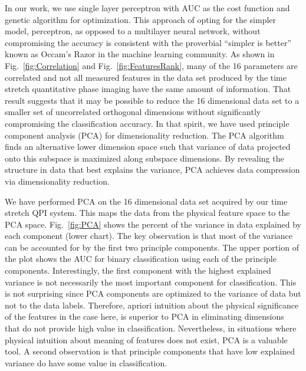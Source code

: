 \documentclass[aps,pra,reprint,superscriptaddress]{revtex4-1}
\begin{document}
In our work, we use single layer perceptron with AUC as the cost function and genetic algorithm for optimization. This approach of opting for the simpler model, perceptron, as opposed to a multilayer neural network, without compromising the accuracy is consistent with the proverbial ``simpler is better'' known as Occam's Razor \cite{domingos1999role} in the machine learning community. As shown in Fig.~\ref{fig:Correlation} and Fig.~\ref{fig:FeaturesRank}, many of the 16 parameters are correlated and not all measured features in the data set produced by the time stretch quantitative phase imaging have the same amount of information. That result suggests that it may be possible to reduce the 16 dimensional data set to a smaller set of uncorrelated orthogonal dimensions without significantly compromising the classification accuracy. In that spirit, we have used principle component analysis (PCA) for dimensionality reduction. The PCA algorithm finds an alternative lower dimension space such that variance of data projected onto this subspace is maximized along subspace dimensions. By revealing the structure in data that best explains the variance, PCA achieves data compression via dimensionality reduction. 

We have performed PCA on the 16 dimensional data set acquired by our time stretch QPI system. This maps the data from the physical feature space to the PCA space. Fig.~\ref{fig:PCA} shows the percent of the variance in data explained by each component (lower chart). The key observation is that most of the variance can be accounted for by the first two principle components. The upper portion of the plot shows the AUC for binary classification using each of the principle components. Interestingly, the first component with the highest explained variance is not necessarily the most important component for classification. This is not surprising since PCA components are optimized to the variance of data but not to the data labels. Therefore, apriori intuition about the physical significance of the features in the case here, is superior to PCA in eliminating dimensions that do not provide high value in classification. Nevertheless, in situations where physical intuition about meaning of features does not exist, PCA is a valuable tool. A second observation is that principle components that have low explained variance do have some value in classification. 
\end{document}
